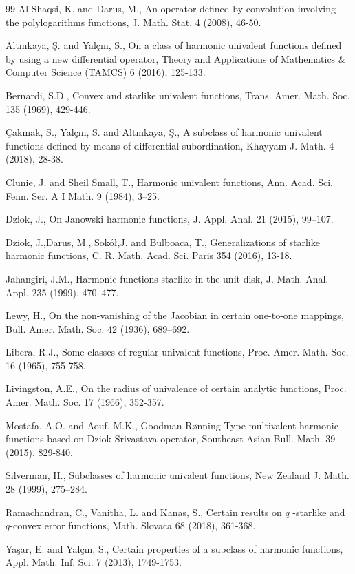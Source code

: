 \documentclass[12pt,reqno]{amsart}
\begin{document}
\begin{thebibliography}{99}
 Al-Shaqsi, K. and Darus, M., An operator defined by convolution
involving the polylogarithms functions, J. Math.
Stat. 4 (2008), 46-50.

 Alt\i nkaya, \c{S}. and Yal\c{c}\i n, S., On a class of harmonic
univalent functions defined by using a new differential operator, Theory and
Applications of Mathematics \& Computer Science (TAMCS) 6 (2016), 125-133.

 Bernardi, S.D., Convex and starlike univalent functions, Trans.
Amer. Math. Soc. 135 (1969), 429-446.

 \c{C}akmak, S., Yal\c{c}\i n, S. and Alt\i nkaya, \c{S}., A subclass
of harmonic univalent functions defined by means of differential
subordination, Khayyam J. Math. 4 (2018), 28-38.

 Clunie, J. and Sheil Small, T., Harmonic univalent functions, Ann.
Acad. Sci. Fenn. Ser. A I Math. 9 (1984), 3--25.

 Dziok, J., On Janowski harmonic functions, J. Appl. Anal. 21
(2015), 99--107.

 Dziok, J.,Darus,  M., Sok\'{o}\l ,J. and Bulboaca, T., Generalizations of starlike harmonic functions, C. R. Math. Acad. Sci. Paris
354 (2016), 13-18.

 Jahangiri, J.M., Harmonic functions starlike in the unit disk, J.
Math. Anal. Appl. 235 (1999), 470--477.

 Lewy, H., On the non-vanishing of the Jacobian in certain
one-to-one mappings, Bull. Amer. Math. Soc. 42 (1936), 689--692.

 Libera, R.J., Some classes of regular univalent functions,
Proc. Amer. Math. Soc. 16 (1965), 755-758.

 Livingston, A.E., On the radius of univalence of certain
analytic functions, Proc. Amer. Math. Soc. 17 (1966), 352-357.

 Mostafa, A.O. and Aouf, M.K., Goodman-R\o nning-Type multivalent
harmonic functions based on Dziok-Srivastava operator, Southeast Asian Bull. Math. 39 (2015), 829-840.

 Silverman, H., Subclasses of harmonic univalent functions, New
Zealand J. Math. 28 (1999), 275--284.

 Ramachandran, C., Vanitha, L. and Kanas, S., Certain results on $q$%
-starlike and $q$-convex error functions, Math. Slovaca 68 (2018),
361-368.

 Ya\c{s}ar, E. and Yal\c{c}\i n, S., Certain properties of a
subclass of harmonic functions, Appl. Math. Inf. Sci. 7 (2013), 1749-1753.
\end{thebibliography}
\end{document}
